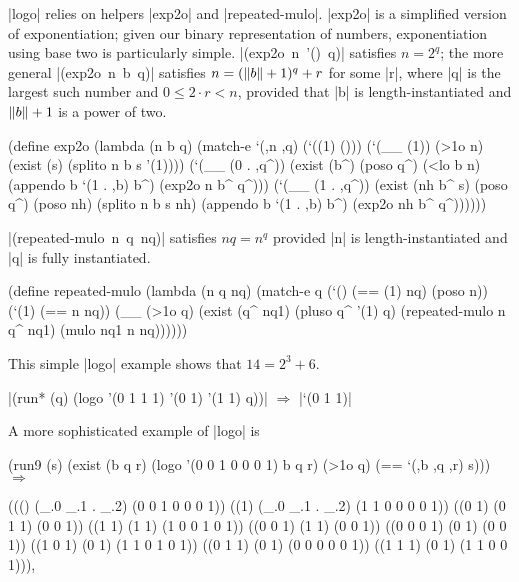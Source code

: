 \scheme|logo| relies on helpers \scheme|exp2o| and
\scheme|repeated-mulo|.  \scheme|exp2o| is a simplified version of
exponentiation; given our binary representation of numbers,
exponentiation using base two is particularly simple.
\mbox{\scheme|(exp2o n '() q)|} satisfies $n = 2^q$; the more general
\mbox{\scheme|(exp2o n b q)|} satisfies $n = (\lVert b\rVert+1)^q + r$ for
some \scheme|r|, where \scheme|q| is the largest such number and $0
\leq 2 \cdot r < n$, provided that \scheme|b| is length-instantiated
and $\lVert b\rVert+1$ is a power of two.

\schemedisplayspace
\begin{schemedisplay}
(define exp2o
  (lambda (n b q)
    (match-e `(,n ,q)
      (`((1) ()))
      (`(__ (1))
       (>1o n)
       (exist (s)
         (splito n b s '(1))))
      (`(__ (0 . ,q^))
       (exist (b^)
         (poso q^)
         (<lo b n)
         (appendo b `(1 . ,b) b^)
         (exp2o n b^ q^)))
      (`(__ (1 . ,q^))
       (exist (nh b^ s)
         (poso q^)
         (poso nh)
         (splito n b s nh)
         (appendo b `(1 . ,b) b^)
         (exp2o nh b^ q^))))))
\end{schemedisplay}


\mbox{\scheme|(repeated-mulo n q nq)|} satisfies $nq = n^q$ provided
\scheme|n| is length-instantiated and \scheme|q| is fully
instantiated.

\schemedisplayspace
\begin{schemedisplay}
(define repeated-mulo
  (lambda (n q nq)
    (match-e q
      (`() (== (1) nq) (poso n))
      (`(1) (== n nq))
      (__
        (>1o q)
        (exist (q^ nq1)
          (pluso q^ '(1) q)
          (repeated-mulo n q^ nq1)
          (mulo nq1 n nq))))))
\end{schemedisplay}

This simple \scheme|logo| example shows that $14 = 2^3 + 6$.

\wspace

\noindent\scheme|(run* (q) (logo '(0 1 1 1) '(0 1) '(1 1) q))| $\Rightarrow$ \scheme|`(0 1 1)|

\wspace

A more sophisticated example of \scheme|logo| is

\schemedisplayspace
\begin{schemedisplay}
(run9 (s)
  (exist (b q r)
    (logo '(0 0 1 0 0 0 1) b q r)
    (>1o q)
    (== `(,b ,q ,r) s))) $\Rightarrow$
\end{schemedisplay}
\nspace
\begin{schemeresponse}
((() (_.0 _.1 . _.2) (0 0 1 0 0 0 1))
 ((1) (_.0  _.1 . _.2) (1 1 0 0 0 0 1))
 ((0 1) (0 1 1) (0 0 1))
 ((1 1) (1 1) (1 0 0 1 0 1))
 ((0 0 1) (1 1) (0 0 1))
 ((0 0 0 1) (0 1) (0 0 1))
 ((1 0 1) (0 1) (1 1 0 1 0 1))
 ((0 1 1) (0 1) (0 0 0 0 0 1))
 ((1 1 1) (0 1) (1 1 0 0 1))),
\end{schemeresponse}

